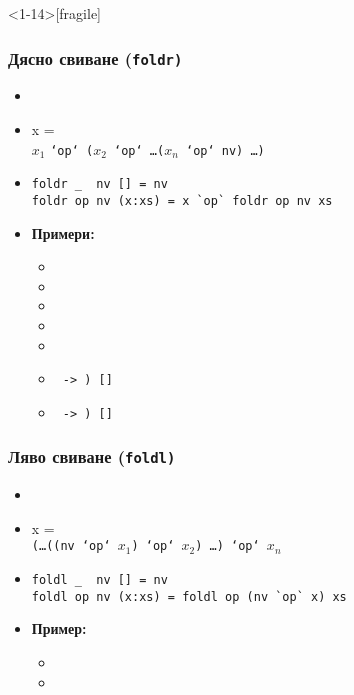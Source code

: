 \documentclass{beamer}
\begin{document}
\begin{frame}<1-14>[fragile]
  \frametitle{Дясно свиване (\tt{foldr})}

  \begin{itemize}[<+->]
  \item {}
  \item {} \hlist x = \\
    $x_1$ \tt{`op` (}$x_2$ \tt{`op`} \ldots \tt($x_n$\tt{ `op` nv)} \ldots\tt)
  \item
\begin{lstlisting}
foldr _  nv [] = nv
foldr op nv (x:xs) = x `op` foldr op nv xs
\end{lstlisting}
  \item \textbf{Примери:}
    \begin{itemize}
    \item {}
    \item {}
    \item {}
    \item {}
    \item {}
    \item {} \tt{ -> ) []}
      \onslide<+->
    \item \footnotesize{}\tt{ -> ) []}
    \end{itemize}
  \end{itemize}
\end{frame}

\begin{frame}[fragile]
  \frametitle{Ляво свиване (\tt{foldl})}

  \begin{itemize}[<+->]
  \item {}
  \item {}\hlist x = \\
    \tt(\ldots\tt{((nv `op` }$x_1$\tt{) `op` }$x_2$\tt) \ldots \tt{) `op` }$x_n$
  \item
\begin{lstlisting}
foldl _  nv [] = nv
foldl op nv (x:xs) = foldl op (nv `op` x) xs
\end{lstlisting}
  \item \textbf{Пример:}
    \begin{itemize}[<.->]
    \item {}
    \item {}
    \end{itemize}
  \end{itemize}
\end{frame}
\end{document}
